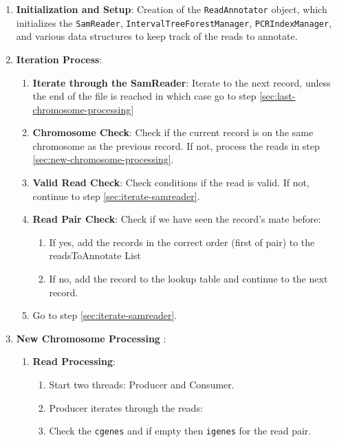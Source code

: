 \documentclass{article}
\begin{document}
    \begin{enumerate}
        \item \textbf{Initialization and Setup}: Creation of the \texttt{ReadAnnotator} object, which initializes the \texttt{SamReader}, \texttt{IntervalTreeForestManager}, \texttt{PCRIndexManager}, and various data structures to keep track of the reads to annotate.
        \item \textbf{Iteration Process}:
        \begin{enumerate}
            \item \textbf{Iterate through the SamReader}: Iterate to the next record, unless the end of the file is reached in which case go to step \ref{sec:last-chromosome-processing} \label{sec:iterate-samreader}
            \item \textbf{Chromosome Check}: Check if the current record is on the same chromosome as the previous record. If not, process the reads in step \ref{sec:new-chromosome-processing}. \label{sec:chromosome-check}
            \item \textbf{Valid Read Check}: Check conditions if the read is valid. If not, continue to step \ref{sec:iterate-samreader}.
            \item \textbf{Read Pair Check}: Check if we have seen the record's mate before:
            \begin{enumerate}
                \item If yes, add the records in the correct order (first of pair) to the readsToAnnotate List
                \item If no, add the record to the lookup table and continue to the next record.
            \end{enumerate}
            \item Go to step \ref{sec:iterate-samreader}.
        \end{enumerate}
        \item \textbf{New Chromosome Processing} \label{sec:new-chromosome-processing}:
        \begin{enumerate}
            \item \textbf{Read Processing}: \label{sec:read-processing}
            \begin{enumerate}
                \item Start two threads: Producer and Consumer.
                \item Producer iterates through the reads: \label{sec:producer}
                \item Check the \texttt{cgenes} and if empty then \texttt{igenes} for the read pair.

\end{enumerate}
\end{enumerate}
\end{enumerate}
\end{document}
